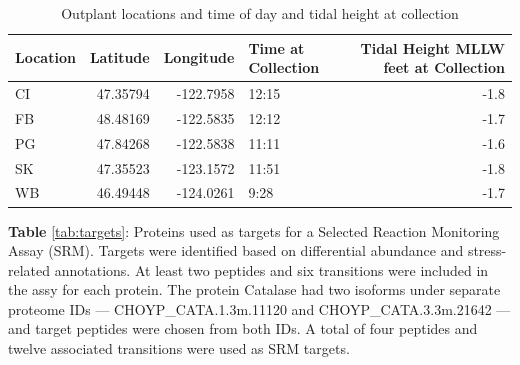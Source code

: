 \documentclass [11pt, proquest] {uwthesis}[2015/03/03]
\begin{document}
\begingroup\fontsize{10}{12}\selectfont
\begin{longtable}[t]{lrrlr}
\caption{\label{tab:deployment}Outplant locations and time of day and tidal height at collection}\\
\toprule
Location & Latitude & Longitude & Time at Collection & Tidal Height  MLLW  feet  at Collection\\
\midrule
CI & 47.35794 & -122.7958 & 12:15 & -1.8\\
FB & 48.48169 & -122.5835 & 12:12 & -1.7\\
PG & 47.84268 & -122.5838 & 11:11 & -1.6\\
SK & 47.35523 & -123.1572 & 11:51 & -1.8\\
WB & 46.49448 & -124.0261 & 9:28 & -1.7\\
\bottomrule
\end{longtable}
\endgroup{}
\clearpage

\textbf{Table} \ref{tab:targets}: Proteins used as targets for a Selected Reaction Monitoring Assay (SRM). Targets were identified based on differential abundance and stress-related annotations. At least two peptides and six transitions were included in the assy for each protein. The protein Catalase had two isoforms under separate proteome IDs --- CHOYP\_CATA.1.3\textbar m.11120 and CHOYP\_CATA.3.3\textbar m.21642 --- and target peptides were chosen from both IDs. A total of four peptides and twelve associated transitions were used as SRM targets.
\end{document}
